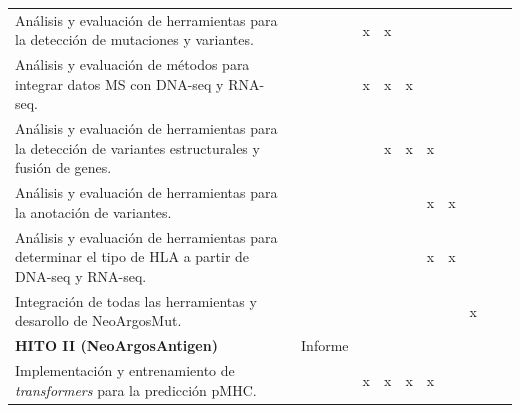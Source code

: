 \documentclass[a4paper,11pt]{article}
\begin{document}
\begin{table}[H]
{{\begin{tabular}{|p{10cm}|l|c|c|c|c|c|c|c|c|}
            Análisis y evaluación de herramientas para la detección de mutaciones y variantes.       &       & x                     &                 x      &                        &                     &                       &                        &                                              &    \\

            Análisis y evaluación de métodos para integrar datos MS con DNA-seq y RNA-seq.       &       & x                     &                 x      &     x                   &                     &                       &                        &                                              &    \\


            

            
            Análisis y evaluación de herramientas para la detección de variantes estructurales y fusión de genes.      &                       &                      &    x                  & x                       &     x           &                      &                        &                                              &    \\

            Análisis y evaluación de herramientas para la anotación de variantes.      &                       &                      &                       &                        & x                      &      x                 &                        &                                              &    \\

            Análisis y evaluación de herramientas para determinar el tipo de HLA a partir de DNA-seq y RNA-seq.      &                       &                      &                      &                        &     x           &     x                 &                        &                                              &    \\

            Integración de todas las herramientas y desarollo de NeoArgosMut.      &                       &                     &                       &                        &                       &                       &    x                    &                                              &    \\
  
		 \hline
  
		
		\textbf{HITO II (NeoArgosAntigen)} & Informe & & & & & & & & \\
		Implementación y entrenamiento de \textit{transformers} para la predicción pMHC. &  &        x             &      x                  &                 x        & x                      &                 &                      & &                                                 \\
  

\end{tabular}}}
\end{table}
\end{document}
